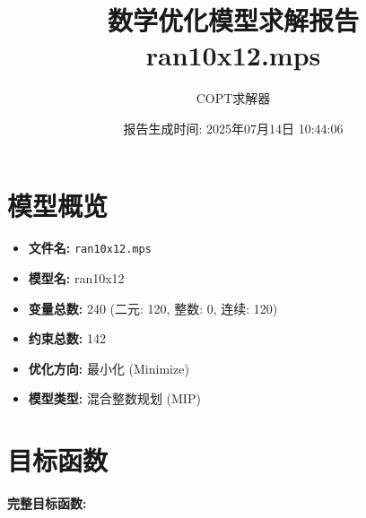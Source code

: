 \documentclass[a4paper,10pt]{article}
\title{数学优化模型求解报告\\{\large ran10x12.mps}}
\author{COPT求解器}
\date{报告生成时间: 2025年07月14日 10:44:06}
\begin{document}
\maketitle
\tableofcontents
\newpage

\section{模型概览}
\begin{itemize}
    \item \textbf{文件名:} \texttt{ran10x12.mps}
    \item \textbf{模型名:} ran10x12
    \item \textbf{变量总数:} 240 (二元: 120, 整数: 0, 连续: 120)
    \item \textbf{约束总数:} 142
    \item \textbf{优化方向:} 最小化 (Minimize)
    \item \textbf{模型类型:} 混合整数规划 (MIP)
\end{itemize}
\section{目标函数}

\textbf{完整目标函数:}
\end{document}
